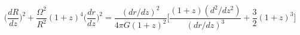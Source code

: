 \begin{equation}\label{Rrecons}
\Big(\frac{dR}{dz}\Big)^2+\frac{\Omega^2}{R^2}(1+z)^4\Big(\frac{dr}{dz}
\Big)^2=\frac{(dr/dz)^2}{4\pi
G(1+z)^2}\Big[\frac{(1+z)(d^2/dz^2)}{(dr/dz)^3}+\frac{3}{2}(1+z)^3
\Big]
\end{equation}

